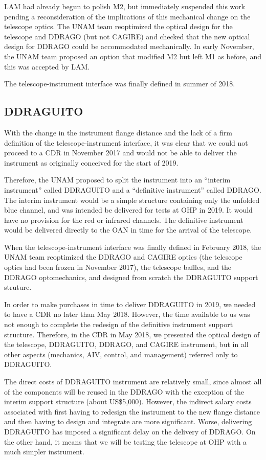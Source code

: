 \documentclass{article}
\begin{document}
LAM had already begun to polish M2, but immediately suspended this work pending a reconsideration of the implications of this mechanical change on the telescope optics. The UNAM team reoptimized the optical design for the telescope and DDRAGO (but not CAGIRE) and checked that the new optical design for DDRAGO could be accommodated mechanically. In early November, the UNAM team proposed an option that modified M2 but left M1 as before, and this was accepted by LAM.

The telescope-instrument interface was finally defined in summer of 2018.

\subsection{DDRAGUITO}

With the change in the instrument flange distance and the lack of a firm definition of the telescope-instrument interface, it was clear that we could not proceed to a CDR in November 2017 and would not be able to deliver the instrument as originally conceived for the start of 2019. 

Therefore, the UNAM proposed to split the instrument into an “interim instrument” called DDRAGUITO and a “definitive instrument” called DDRAGO. The interim instrument would be a simple structure containing only the unfolded blue channel, and was intended be delivered for tests at OHP in 2019. It would have no provision for the red or infrared channels. The definitive instrument would be delivered directly to the OAN in time for the arrival of the telescope.

When the telescope-instrument interface was finally defined in February 2018, the UNAM team reoptimized the DDRAGO and CAGIRE optics (the telescope optics had been frozen in November 2017), the telescope baffles, and the DDRAGO optomechanics, and designed from scratch the DDRAGUITO support struture.

In order to make purchases in time to deliver DDRAGUITO in 2019, we needed to have a CDR no later than May 2018. However, the time available to us was not enough to complete the redesign of the definitive instrument support structure. Therefore, in the CDR in May 2018, we presented the optical design of the telescope, DDRAGUITO, DDRAGO, and CAGIRE instrument, but in all other aspects (mechanics, AIV, control, and management) referred only to DDRAGUITO.

The direct costs of DDRAGUITO instrument are relatively small, since almost all of the components will be reused in the DDRAGO with the exception of the interim support structure (about US\$5,000). However, the indirect salary costs associated with first having to redesign the instrument to the new flange distance and then having to design and integrate are more significant. Worse, delivering DDRAGUITO has imposed a significant delay on the delivery of DDRAGO. On the other hand, it means that we will be testing the telescope at OHP with a much simpler instrument.
\end{document}
